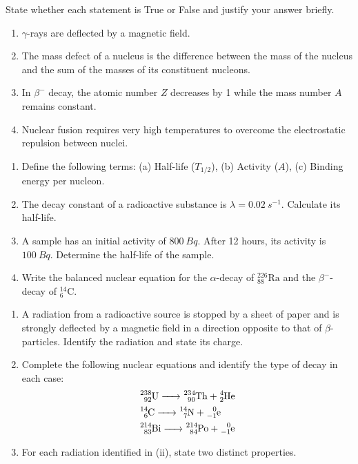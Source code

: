 \documentclass[11pt]{article}
\begin{document}
\begin{exercice}
State whether each statement is True or False and justify your answer briefly.
\begin{enumerate}
    \item $\gamma$-rays are deflected by a magnetic field.
    \item The mass defect of a nucleus is the difference between the mass of the nucleus and the sum of the masses of its constituent nucleons.
    \item In $\beta^{-}$ decay, the atomic number $Z$ decreases by 1 while the mass number $A$ remains constant.
    \item Nuclear fusion requires very high temperatures to overcome the electrostatic repulsion between nuclei.
\end{enumerate}
\end{exercice}

\begin{exercice}
\begin{enumerate}
    \item Define the following terms: (a) Half-life ($T_{1/2}$), (b) Activity ($A$), (c) Binding energy per nucleon.
    \item The decay constant of a radioactive substance is $\lambda = \SI{0.02}{s^{-1}}$. Calculate its half-life.
    \item A sample has an initial activity of $\SI{800}{Bq}$. After 12 hours, its activity is $\SI{100}{Bq}$. Determine the half-life of the sample.
    \item Write the balanced nuclear equation for the $\alpha$-decay of $^{226}_{88}\text{Ra}$ and the $\beta^{-}$-decay of $^{14}_{6}\text{C}$.
\end{enumerate}
\end{exercice}

\begin{exercice}
\begin{enumerate}
    \item A radiation from a radioactive source is stopped by a sheet of paper and is strongly deflected by a magnetic field in a direction opposite to that of $\beta$-particles. Identify the radiation and state its charge.
    \item Complete the following nuclear equations and identify the type of decay in each case:
\begin{align*}
        &\ce{^{238}_{92}U -> ^{234}_{90}Th + ^{4}_{2}He} \\
        &\ce{^{14}_{6}C -> ^{14}_{7}N + ^{0}_{-1}e} \\
        &\ce{^{214}_{83}Bi -> ^{214}_{84}Po + ^{0}_{-1}e}
    \end{align*}
    \item For each radiation identified in (ii), state two distinct properties.
\end{enumerate}
\end{exercice}
\end{document}
